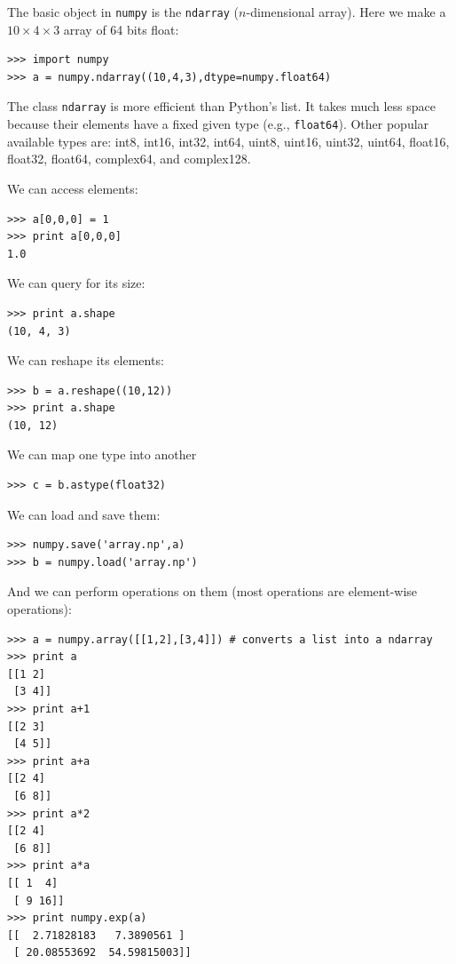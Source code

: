 \documentclass[justified,sixbynine]{tufte-book}
\def\ft{\small\tt}
\theoremstyle{plain}%
\theoremstyle{definition}
\theoremstyle{remark}
\begin{document}
\begin{fullwidth}
The basic object in {\ft numpy} is the {\ft ndarray} ($n$-dimensional array). Here we make a $10\times 4\times 3$ array of 64 bits float:

\begin{lstlisting}
>>> import numpy
>>> a = numpy.ndarray((10,4,3),dtype=numpy.float64)
\end{lstlisting}

The class {\ft ndarray} is more efficient than Python's list. It takes much less space because their elements have a fixed given type (e.g., {\ft float64}). Other popular available types are: int8, int16, int32, int64, uint8, uint16, uint32, uint64, float16, float32, float64, complex64, and complex128.

We can access elements:

\begin{lstlisting}
>>> a[0,0,0] = 1
>>> print a[0,0,0]
1.0
\end{lstlisting}

We can query for its size:

\begin{lstlisting}
>>> print a.shape
(10, 4, 3)
\end{lstlisting}

We can reshape its elements:

\begin{lstlisting}
>>> b = a.reshape((10,12))
>>> print a.shape
(10, 12)
\end{lstlisting}

We can map one type into another
\begin{lstlisting}
>>> c = b.astype(float32)
\end{lstlisting}

We can load and save them:

\begin{lstlisting}
>>> numpy.save('array.np',a)
>>> b = numpy.load('array.np')
\end{lstlisting}

And we can perform operations on them (most operations are element-wise operations):

\begin{lstlisting}
>>> a = numpy.array([[1,2],[3,4]]) # converts a list into a ndarray
>>> print a
[[1 2]
 [3 4]]
>>> print a+1
[[2 3]
 [4 5]]
>>> print a+a
[[2 4]
 [6 8]]
>>> print a*2
[[2 4]
 [6 8]]
>>> print a*a
[[ 1  4]
 [ 9 16]]
>>> print numpy.exp(a)
[[  2.71828183   7.3890561 ]
 [ 20.08553692  54.59815003]]
\end{lstlisting}


\end{fullwidth}
\end{document}
